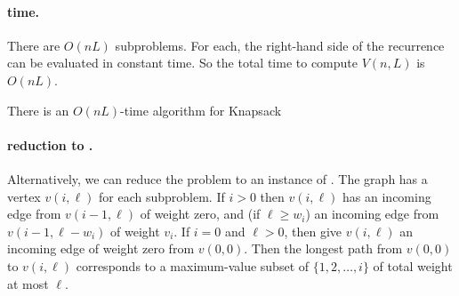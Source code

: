 \paragraph{time.}
There are $O(n L)$ subproblems.
For each, the right-hand side of the recurrence can be evaluated in constant time.
So the total time to compute $V(n,L)$ is $O(n L)$.

\begin{theorem}
  There is an $O(nL)$-time algorithm for Knapsack
\end{theorem}

\paragraph{reduction to .}
Alternatively, we can reduce the problem to an instance of .
The graph has a vertex $v(i,\ell)$ for each subproblem.
If $i> 0$ then $v(i,\ell)$ has an incoming edge from $v(i-1, \ell)$ of weight zero,
and (if $\ell\ge w_i$) an incoming edge from $v(i-1, \ell-w_i)$ of weight $v_i$.
If $i=0$ and $\ell>0$, then give $v(i, \ell)$ an incoming edge of weight zero from $v(0,0)$.
Then the longest path from $v(0,0)$ to $v(i,\ell)$ corresponds to a maximum-value subset of
$\{1,2,\ldots, i\}$ of total weight at most $\ell$.




  

  




